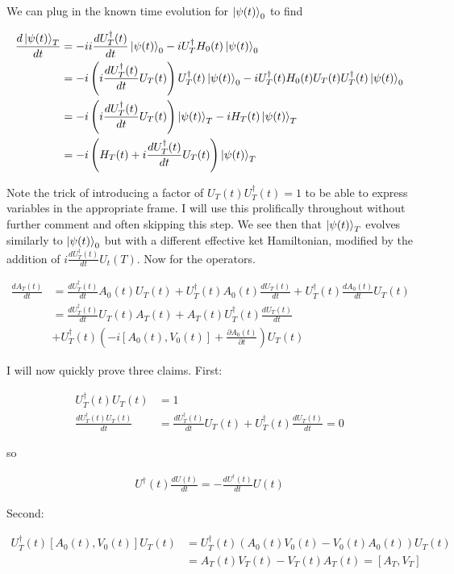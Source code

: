 \documentclass[12pt]{article}
\newcommand{\ddt}[1]{\frac{d #1}{dt}}
\begin{document}
We can plug in the known time evolution for $\ket{\psi(t)}_0$ to find

\begin{align}
\ddt{\ket{\psi(t)}_T} &= -i i\ddt{U_T^{\dag}(t)} \ket{\psi(t)}_0 -i U_T^{\dag} H_0(t) \ket{\psi(t)}_0\\
&= -i \left(i\ddt{U_T^{\dag}(t)} U_T(t)\right) U_T^{\dag}(t) \ket{\psi(t)}_0 -i U_T^{\dag}(t) H_0(t)U_T(t)U_T^{\dag}(t) \ket{\psi(t)}_0\\
&= -i \left(i\ddt{U_T^{\dag}(t)} U_T(t)\right) \ket{\psi(t)}_T - i H_T(t) \ket{\psi(t)}_T\\
&= -i \left(H_T(t) + i \ddt{U_T^{\dag}(t)} U_T(t)\right)\ket{\psi(t)}_T
\end{align}

Note the trick of introducing a factor of $U_T(t)U_T^{\dag}(t) = 1$ to be able to express variables in the appropriate frame. I will use this prolifically throughout without further comment and often skipping this step.
We see then that $\ket{\psi(t)}_T$ evolves similarly to $\ket{\psi(t)}_0$ but with a different effective ket Hamiltonian, modified by the addition of $i \ddt{U_T^{\dag}(t)} U_t(T)$. Now for the operators.

\begin{align}
\ddt{A_T(t)} &= \ddt{U_T^{\dag}(t)}A_0(t)U_T(t) + U_T^{\dag}(t)A_0(t)\ddt{U_T(t)} + U_T^{\dag}(t) \ddt{A_0(t)} U_T(t)\\
&= \ddt{U_T^{\dag}(t)} U_T(t)A_T(t) + A_T(t) U_T^{\dag}(t) \ddt{U_T(t)}\\
&+ U_T^{\dag}(t) \left(-i[A_0(t),V_0(t)] + \frac{\partial A_0(t)}{\partial t}\right)U_T(t)
\end{align}

I will now quickly prove three claims.  First:

\begin{align}
U_T^{\dag}(t) U_T(t) &= 1\\
\ddt{U_T^{\dag}(t) U_T(t)} &= \ddt{U_T^{\dag}(t)}U_T(t) + U_T^{\dag}(t) \ddt{U_T(t)} = 0
\end{align}

so

\begin{align}
U^{\dag}(t) \ddt{U(t)} = - \ddt{U^{\dag}(t)} U(t)
\end{align}

Second:

\begin{align}
U_T^{\dag}(t)[A_0(t),V_0(t)]U_T(t) &= U_T^{\dag}(t)(A_0(t)V_0(t) - V_0(t)A_0(t))U_T(t)\\
&= A_T(t)V_T(t) - V_T(t)A_T(t) = [A_T,V_T]
\end{align}
\end{document}
